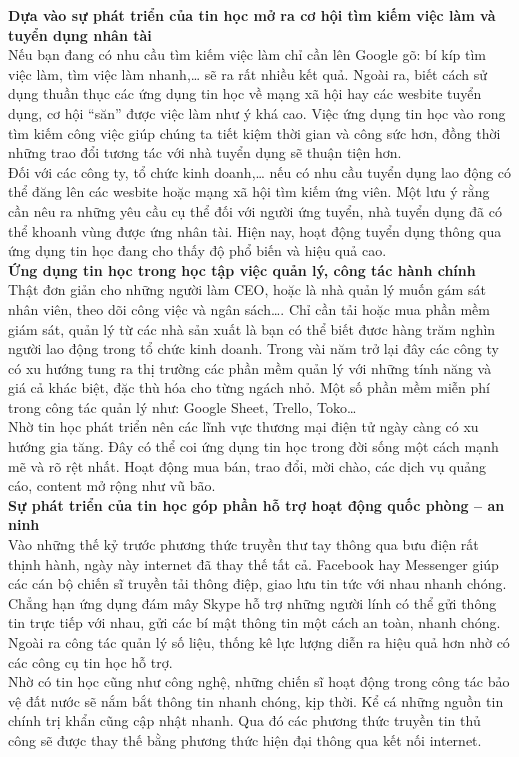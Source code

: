 \documentclass[12pt,a4paper]{report}
\begin{document}
     \newline
     \newline
     \textbf{Dựa vào sự phát triển của tin học mở ra cơ hội tìm kiếm việc làm và tuyển dụng nhân tài}\\
     Nếu bạn đang có nhu cầu tìm kiếm việc làm chỉ cần lên Google gõ: bí kíp tìm việc làm, tìm việc làm nhanh,… sẽ ra rất nhiều kết quả. Ngoài ra, biết cách sử dụng thuần thục các ứng dụng tin học về mạng xã hội hay các wesbite tuyển dụng, cơ hội “săn” được việc làm như ý khá cao. Việc ứng dụng tin học vào rong tìm kiếm công việc giúp chúng ta tiết kiệm thời gian và công sức hơn, đồng thời những trao đổi tương tác với nhà tuyển dụng sẽ thuận tiện hơn.\\Đối với các công ty, tổ chức kinh doanh,… nếu có nhu cầu tuyển dụng lao động có thể đăng lên các wesbite hoặc mạng xã hội tìm kiếm ứng viên. Một lưu ý rằng cần nêu ra những yêu cầu cụ thể đối với người ứng tuyển, nhà tuyển dụng đã có thể khoanh vùng được ứng nhân tài. Hiện nay, hoạt động tuyển dụng thông qua ứng dụng tin học đang cho thấy độ phổ biến và hiệu quả cao.\\
     \textbf{Ứng dụng tin học trong học tập việc quản lý, công tác hành chính}\\
     Thật đơn giản cho những người làm CEO, hoặc là nhà quản lý muốn gám sát nhân viên, theo dõi công việc và ngân sách…. Chỉ cần tải hoặc mua phần mềm giám sát, quản lý từ các nhà sản xuất là bạn có thể biết đươc hàng trăm nghìn người lao động trong tổ chức kinh doanh. Trong vài năm trở lại đây các công ty có xu hướng tung ra thị trường các phần mềm quản lý với những tính năng và giá cả khác biệt, đặc thù hóa cho từng ngách nhỏ. Một số phần mềm miễn phí trong công tác quản lý như: Google Sheet, Trello, Toko…\\ Nhờ tin học phát triển nên các lĩnh vực thương mại điện tử ngày càng có xu hướng gia tăng. Đây có thể coi ứng dụng tin học trong đời sống một cách mạnh mẽ và rõ rệt nhất. Hoạt động mua bán, trao đổi, mời chào, các dịch vụ quảng cáo, content mở rộng như vũ bão.\\
     \textbf{Sự phát triển của tin học góp phần hỗ trợ hoạt động quốc phòng – an ninh}\\
     Vào những thế kỷ trước phương thức truyền thư tay thông qua bưu điện rất thịnh hành, ngày này internet đã thay thế tất cả. Facebook hay Messenger giúp các cán bộ chiến sĩ truyền tải thông điệp, giao lưu tin tức với nhau nhanh chóng. Chẳng hạn ứng dụng đám mây Skype hỗ trợ những người lính có thể gửi thông tin trực tiếp với nhau, gửi các bí mật thông tin một cách an toàn, nhanh chóng. Ngoài ra công tác quản lý số liệu, thống kê lực lượng diễn ra hiệu quả hơn nhờ có các công cụ tin học hỗ trợ.\\Nhờ có tin học cũng như công nghệ, những chiến sĩ hoạt động trong công tác bảo vệ đất nước sẽ nắm bắt thông tin nhanh chóng, kịp thời. Kể cá những nguồn tin chính trị khẩn cũng cập nhật nhanh. Qua đó các phương thức truyền tin thủ công sẽ được thay thế bằng phương thức hiện đại thông qua kết nối internet.\\
\end{document}
